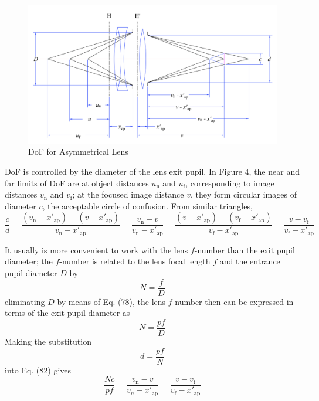 \documentclass[11pt, oneside]{scrartcl}   	%
\begin{document}
\begin{figure}[htbp] %
   \centering
   \includegraphics[width=\linewidth]{figure/fig_dofd_4} 
   \caption{DoF for Asymmetrical Lens}
   \label{fig:DOFasymlens}
\end{figure}
DoF is controlled by the diameter of the lens exit pupil. In Figure 4, the near and far limits of DoF are at object distances $u_\mathrm{n}$ and $u_\mathrm{f}$, corresponding to image distances $v_\mathrm{n}$ and $v_\mathrm{f}$; at the focused image distance $v$, they form circular images of diameter $c$, the acceptable circle of confusion. From similar triangles,
\begin{equation}
\frac c d = \frac{(v_\mathrm{n}-x'_\mathrm{ap}) - (v-x'_\mathrm{ap})}{v_\mathrm{n}-x'_\mathrm{ap}} =
\frac {v_\mathrm{n} - v}{v_\mathrm{n}-x'_\mathrm{ap}} =
\frac{(v-x'_\mathrm{ap}) - (v_\mathrm{f}-x'_\mathrm{ap})}{v_\mathrm{f}-x'_\mathrm{ap}} =
\frac {v - v_\mathrm{f}}{v_\mathrm{f}-x'_\mathrm{ap}}
\label{eq:82}
\end{equation}


It usually is more convenient to work with the lens $f$-number than the exit pupil diameter;
the $f$-number is related to the lens focal length $f$ and the entrance pupil diameter $D$ by 
\begin{equation}
N = \frac f D
\end{equation}
eliminating $D$ by means of Eq. (78), the lens $f$-number then can be expressed in terms of the
exit pupil diameter as
\begin{equation}
N = \frac {pf} D
\end{equation}
Making the substitution
\begin{equation}
d = \frac {pf} N
\end{equation}
into Eq. (82) gives
\begin{equation}
   \frac {N\!c}{pf} = \frac{v_\mathrm{n} - v}{v_n - x'_\mathrm{ap}} 
                          = \frac {v - v_\mathrm{f}}{v_\mathrm{f}- x'_\mathrm{ap}}
   \label{eq:83}
\end{equation}
\end{document}
